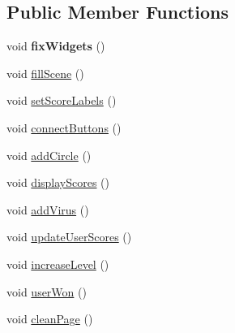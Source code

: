 \subsection*{Public Member Functions}
\begin{DoxyCompactItemize}
\item 
\hypertarget{classGame1scene_a92082d74a5921f0f03b24720faefdca9}{void {\bfseries fix\-Widgets} ()}\label{classGame1scene_a92082d74a5921f0f03b24720faefdca9}

\item 
void \hyperlink{classGame1scene_ad0f42592819de78b39f13634fcba633a}{fill\-Scene} ()
\item 
void \hyperlink{classGame1scene_a69cb457788ea97d180888e4448e57ed5}{set\-Score\-Labels} ()
\item 
void \hyperlink{classGame1scene_a9e0a1ce23abc7475ec91d48ec2817c12}{connect\-Buttons} ()
\item 
void \hyperlink{classGame1scene_a9ad6591722ae5f53bef08e27a9fa8f0b}{add\-Circle} ()
\item 
void \hyperlink{classGame1scene_ab4a26256d8a8f57fe62c02952458f297}{display\-Scores} ()
\item 
void \hyperlink{classGame1scene_ae1391e19629f4d73cf7a2c789971b5ff}{add\-Virus} ()
\item 
void \hyperlink{classGame1scene_ac6d3aaa8561d03ae5fd737d4f1472598}{update\-User\-Scores} ()
\item 
void \hyperlink{classGame1scene_a2dcaf7dc9b7d3b490cc5af28d438d543}{increase\-Level} ()
\item 
void \hyperlink{classGame1scene_ac41ffb2804245da3a44a212866a9f574}{user\-Won} ()
\item 
void \hyperlink{classGame1scene_a36fc7dbaa744c866cfb5966c05784d87}{clean\-Page} ()
\end{DoxyCompactItemize}
